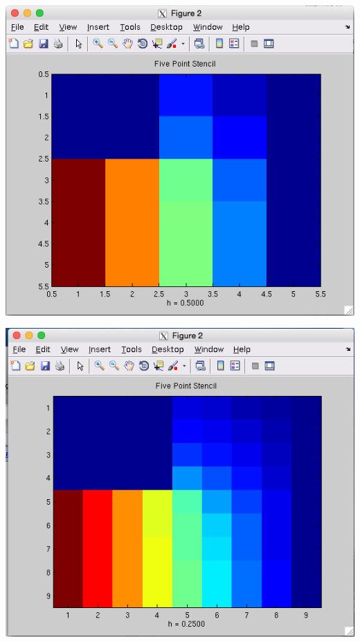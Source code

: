 \documentclass[11pt, oneside]{article}   	%
\begin{document}
\centerline{\includegraphics[scale = 0.55]{FivePoint_h1.png}}

\centerline{\includegraphics[scale = 0.55]{FivePoint_h2.png}}
\end{document}
